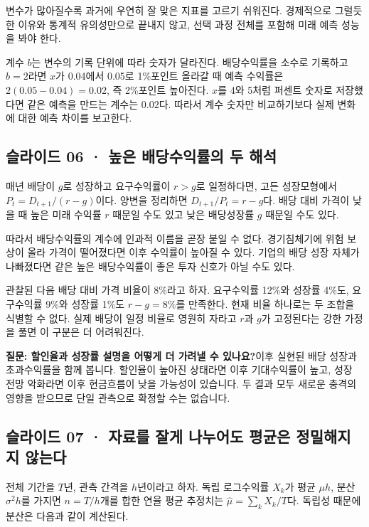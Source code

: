 \documentclass[11pt,a4paper]{article}
\begin{document}
변수가 많아질수록 과거에 우연히 잘 맞은 지표를 고르기 쉬워진다. 경제적으로 그럴듯한 이유와 통계적 유의성만으로 끝내지 않고, 선택 과정 전체를 포함해 미래 예측 성능을 봐야 한다.\par

계수 $b$는 변수의 기록 단위에 따라 숫자가 달라진다. 배당수익률을 소수로 기록하고 $b=2$라면 $x$가 0.04에서 0.05로 1\%포인트 올라갈 때 예측 수익률은 $2(0.05-0.04)=0.02$, 즉 2\%포인트 높아진다. $x$를 4와 5처럼 퍼센트 숫자로 저장했다면 같은 예측을 만드는 계수는 $0.02$다. 따라서 계수 숫자만 비교하기보다 실제 변화에 대한 예측 차이를 보고한다.\par

\subsection{슬라이드 06 · 높은 배당수익률의 두 해석}
매년 배당이 $g$로 성장하고 요구수익률이 $r>g$로 일정하다면, 고든 성장모형에서 $P_t=D_{t+1}/(r-g)$이다. 양변을 정리하면 $D_{t+1}/P_t=r-g$다. 배당 대비 가격이 낮을 때 높은 미래 수익률 $r$ 때문일 수도 있고 낮은 배당성장률 $g$ 때문일 수도 있다.\par

따라서 배당수익률의 계수에 인과적 이름을 곧장 붙일 수 없다. 경기침체기에 위험 보상이 올라 가격이 떨어졌다면 이후 수익률이 높아질 수 있다. 기업의 배당 성장 자체가 나빠졌다면 같은 높은 배당수익률이 좋은 투자 신호가 아닐 수도 있다.\par

관찰된 다음 배당 대비 가격 비율이 8\%라고 하자. 요구수익률 12\%와 성장률 4\%도, 요구수익률 9\%와 성장률 1\%도 $r-g=8\%$를 만족한다. 현재 비율 하나로는 두 조합을 식별할 수 없다. 실제 배당이 일정 비율로 영원히 자라고 $r$과 $g$가 고정된다는 강한 가정을 풀면 이 구분은 더 어려워진다.\par

\begin{samepage}\par\medskip\noindent\textbf{질문: 할인율과 성장률 설명을 어떻게 더 가려낼 수 있나요?}\quad 이후 실현된 배당 성장과 초과수익률을 함께 봅니다. 할인율이 높아진 상태라면 이후 기대수익률이 높고, 성장 전망 악화라면 이후 현금흐름이 낮을 가능성이 있습니다. 두 결과 모두 새로운 충격의 영향을 받으므로 단일 관측으로 확정할 수는 없습니다.\par\end{samepage}

\subsection{슬라이드 07 · 자료를 잘게 나누어도 평균은 정밀해지지 않는다}
전체 기간을 $T$년, 관측 간격을 $h$년이라고 하자. 독립 로그수익률 $X_k$가 평균 $\mu h$, 분산 $\sigma^2h$를 가지면 $n=T/h$개를 합한 연율 평균 추정치는 $\hat\mu=\sum_k X_k/T$다. 독립성 때문에 분산은 다음과 같이 계산된다.\par
\end{document}
